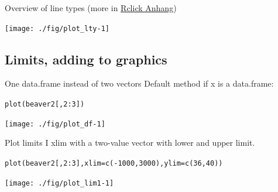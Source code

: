 \documentclass[xcolor=table,           xcolor=dvipsnames]{beamer}\usepackage[]{graphicx}\usepackage[]{color}
\makeatletter
\newcommand{\hlnum}[1]{\textcolor[rgb]{0,0,0}{#1}}
\newcommand{\hlopt}[1]{\textcolor[rgb]{0,0,0}{#1}}
\newcommand{\hlstd}[1]{\textcolor[rgb]{0,0,0}{#1}}
\newcommand{\hlkwc}[1]{\textcolor[rgb]{1,0,1}{#1}}
\newcommand{\hlkwd}[1]{\textcolor[rgb]{0,0,1}{#1}}
\newenvironment{kframe}{%
 \def\at@end@of@kframe{}%
 \ifinner\ifhmode%
  \def\at@end@of@kframe{\end{minipage}}%
  \begin{minipage}{\columnwidth}%
 \fi\fi%
 \def\FrameCommand##1{\hskip\@totalleftmargin \hskip-\fboxsep
 \colorbox{shadecolor}{##1}\hskip-\fboxsep
     \hskip-\linewidth \hskip-\@totalleftmargin \hskip\columnwidth}%
 \MakeFramed {\advance\hsize-\width
   \@totalleftmargin\z@ \linewidth\hsize
   \@setminipage}}%
 {\par\unskip\endMakeFramed%
 \at@end@of@kframe}
\newenvironment{knitrout}{}{} %
\makeatother
\begin{document}

\begin{frame}[fragile]{Overview of line types (more in \href{https://dl.dropboxusercontent.com/u/4836866/Rclick/Anhang.pdf}{Rclick Anhang})}
\begin{knitrout}
\color{fgcolor}

{\centering \texttt{[image: ./fig/plot\_lty-1]} 

}



\end{knitrout}
\end{frame}


\subsection{Limits, adding to graphics}

\begin{frame}[fragile]{One data.frame instead of two vectors}
Default method if x is a data.frame:
\begin{knitrout}
\color{fgcolor}\begin{kframe}
\begin{alltt}
\hlkwd{plot}\hlstd{( beaver2[ ,}\hlnum{2}\hlopt{:}\hlnum{3}\hlstd{] )}
\end{alltt}
\end{kframe}

{\centering \texttt{[image: ./fig/plot\_df-1]} 

}



\end{knitrout}
\end{frame}


\begin{frame}[fragile]{Plot limits I}
xlim with a two-value vector with lower and upper limit.
\begin{knitrout}
\color{fgcolor}\begin{kframe}
\begin{alltt}
\hlkwd{plot}\hlstd{(beaver2[ ,}\hlnum{2}\hlopt{:}\hlnum{3}\hlstd{],} \hlkwc{xlim}\hlstd{=}\hlkwd{c}\hlstd{(}\hlopt{-}\hlnum{1000}\hlstd{,}\hlnum{3000}\hlstd{),}  \hlkwc{ylim}\hlstd{=}\hlkwd{c}\hlstd{(}\hlnum{36}\hlstd{,}\hlnum{40}\hlstd{))}
\end{alltt}
\end{kframe}

{\centering \texttt{[image: ./fig/plot\_lim1-1]} 

}



\end{knitrout}
\end{frame}
\end{document}
